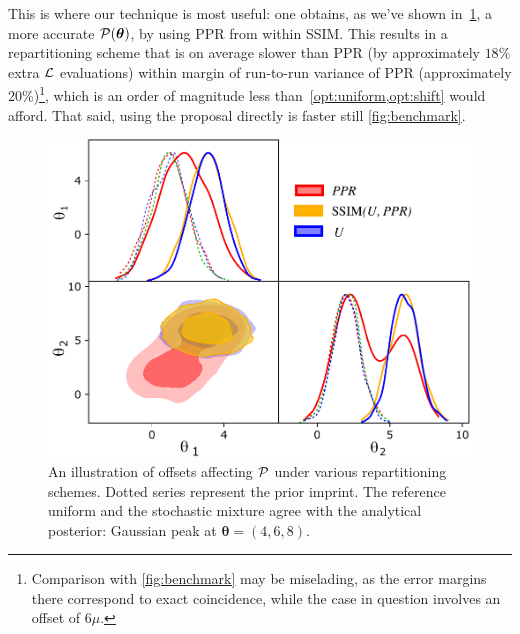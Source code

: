 \documentclass[usenatbib]{mnras}
\begin{document}
This is where our technique is most useful: one obtains, as we've
shown in~\cref{fig:convergence}, a more accurate
\({\cal P}(\bm{\theta})\), by using PPR from within SSIM. This results
in a repartitioning scheme that is on average slower than PPR (by
approximately \(18\%\) extra \({\cal L}\) evaluations) within margin
of run-to-run variance of PPR (approximately
\(20\%\))\footnote{Comparison with \cref{fig:benchmark} may be
  miselading, as the error margins there correspond to exact
  coincidence, while the case in question involves an offset of
  $6\mu$. }, which is an order of magnitude less
than~\vref{opt:uniform,opt:shift} would afford. That said, using the
proposal directly is faster still \cref{fig:benchmark}.

\begin{figure}
  \includegraphics[width=0.99\columnwidth]{./illustrations/convergence.pdf}
  \caption{An illustration of offsets affecting ${\cal P}$ under
    various repartitioning schemes. Dotted series represent the prior
    imprint. The reference uniform and the stochastic mixture agree
    with the analytical posterior: Gaussian peak at
    $\bm{\theta} = (4, 6, 8)$. \label{fig:convergence}}
\end{figure}
\end{document}
